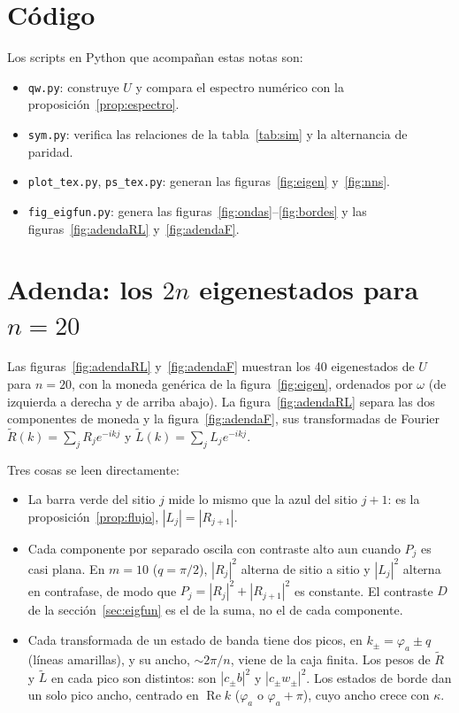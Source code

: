 \documentclass[11pt,a4paper]{article}
\theoremstyle{remark}
\newcommand{\re}{\operatorname{Re}}
\begin{document}
\appendix
\section{Código}
Los scripts en Python que acompañan estas notas son:
\begin{itemize}
\item \texttt{qw.py}: construye $U$ y compara el espectro numérico con la
proposición~\ref{prop:espectro}.
\item \texttt{sym.py}: verifica las relaciones de la tabla~\ref{tab:sim} y la
alternancia de paridad.
\item \texttt{plot\_tex.py}, \texttt{ps\_tex.py}: generan las
figuras~\ref{fig:eigen} y~\ref{fig:nns}.
\item \texttt{fig\_eigfun.py}: genera las figuras~\ref{fig:ondas}--\ref{fig:bordes}
y las figuras~\ref{fig:adendaRL} y~\ref{fig:adendaF}.
\end{itemize}

\clearpage
\section{Adenda: los $2n$ eigenestados para $n=20$}

Las figuras~\ref{fig:adendaRL} y~\ref{fig:adendaF} muestran los 40 eigenestados
de $U$ para $n=20$, con la moneda genérica de la figura~\ref{fig:eigen},
ordenados por $\omega$ (de izquierda a derecha y de arriba abajo). La
figura~\ref{fig:adendaRL} separa las dos componentes de moneda y la
figura~\ref{fig:adendaF}, sus transformadas de Fourier
$\tilde R(k)=\sum_jR_je^{-ikj}$ y $\tilde L(k)=\sum_jL_je^{-ikj}$.

Tres cosas se leen directamente:
\begin{itemize}
\item La barra verde del sitio $j$ mide lo mismo que la azul del sitio $j+1$:
es la proposición~\ref{prop:flujo}, $|L_j|=|R_{j+1}|$.
\item Cada componente por separado oscila con contraste alto aun cuando $P_j$ es
casi plana. En $m=10$ ($q=\pi/2$), $|R_j|^2$ alterna de sitio a sitio y
$|L_j|^2$ alterna en contrafase, de modo que $P_j=|R_j|^2+|R_{j+1}|^2$ es
constante. El contraste $D$ de la sección~\ref{sec:eigfun} es el de la suma, no
el de cada componente.
\item Cada transformada de un estado de banda tiene dos picos, en $k_\pm=\varphi_a\pm q$
(líneas amarillas), y su ancho, $\sim2\pi/n$, viene de la caja finita. Los pesos
de $\tilde R$ y $\tilde L$ en cada pico son distintos: son $|c_\pm b|^2$ y
$|c_\pm w_\pm|^2$. Los estados de borde dan un solo pico ancho, centrado en
$\re k$ ($\varphi_a$ o $\varphi_a+\pi$), cuyo ancho crece con $\kappa$.
\end{itemize}
\end{document}
